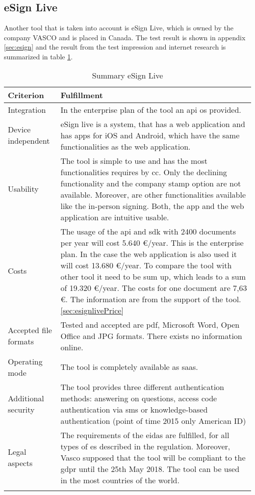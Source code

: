 \subsection{eSign Live}
Another tool that is taken into account is eSign Live, which is owned by the company VASCO and is placed in Canada. The test result is shown in appendix \ref{sec:esign} and the result from the test impression and internet research is summarized in table \ref{tab:esign}.
	\begin{longtable}{|p{4cm}|p{10cm}|} \hline
		Criterion & Fulfillment \\ \hline
		Integration & In the enterprise plan of the tool an \gls{api} os provided. \parencite{esign2018info} \\ \hline
		Device independent & eSign live is a system, that has a web application and has \glspl{app} for iOS and Android, which have the same functionalities as the web application. \parencite{esign2018info} \\ \hline
		Usability & The tool is simple to use and has the most functionalities requires by \gls{cc}. Only the declining functionality and the company stamp option are not available. Moreover, are other functionalities available like the in-person signing. Both, the \gls{app} and the web application are intuitive usable.  \\ \hline
		Costs & The usage of the \gls{api} and \gls{sdk} with 2400 documents per year will cost 5.640 \euro/year. This is the enterprise plan. In the case the web application is also used it will cost 13.680 \euro/year. To compare the tool with other tool it need to be sum up, which leads to a sum of 19.320 \euro/year. The costs for one document are 7,63 \euro. The information are from the support of the tool. \ref{sec:esignlivePrice} \\ \hline
		Accepted file formats & Tested and accepted are \gls{pdf}, Microsoft Word, Open Office and JPG formats. There exists no information online.\\ \hline
		Operating mode & The tool is completely available as \gls{saas}.\\ \hline
		Additional security & The tool provides three different authentication methods: answering on questions, access code authentication via \gls{sms} or knowledge-based authentication (point of time 2015 only American ID) \parencite{esign2018security} \\ \hline
		Legal aspects & The requirements of the \gls{eidas} are fulfilled, for all types of \gls{es} described in the regulation. Moreover, Vasco supposed that the tool will be compliant to the \gls{gdpr} until the 25th May 2018. The tool can be used in the most countries of the world. \parencite{esign2018eidas,esign2018legal} \\ \hline
	\caption{Summary eSign Live}
	\label{tab:esign}
	\end{longtable}

